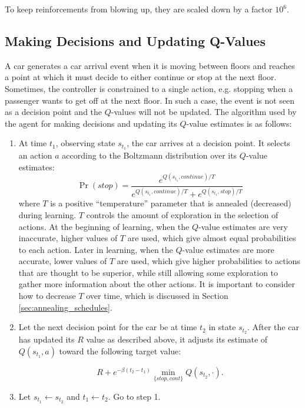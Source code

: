To keep reinforcements from blowing up, they are scaled down by a factor $10^6$.

\label{sec:action_selection}
\subsection{Making Decisions and Updating Q-Values}

A car generates a car arrival event when it is moving between floors and reaches a point at which it must decide to either continue or stop at the next floor. Sometimes, the controller is constrained to a single action, e.g. stopping when a passenger wants to get off at the next floor. In such a case, the event is not seen as a decision point and the $Q$-values will not be updated. The algorithm used by the agent for making decisions and updating its $Q$-value estimates is as follows:
\begin{enumerate}
    \item At time $t_1$, observing state $s_{t_1}$, the car arrives at a decision point. It selects an action $a$ according to the Boltzmann distribution over its $Q$-value estimates:
    \[
        \Pr(stop) = \frac{e^{Q(s_{t_1},continue)/T}}{e^{Q(s_{t_1},continue)/T} + e^{Q(s_{t_1},stop)/T}}
    \]
    where $T$ is a positive ``temperature'' parameter that is annealed (decreased) during learning. $T$ controls the amount of exploration in the selection of actions. At the beginning of learning, when the $Q$-value estimates are very inaccurate, higher values of $T$ are used, which give almost equal probabilities to each action. Later in learning, when the $Q$-value estimates are more accurate, lower values of $T$ are used, which give higher probabilities to actions that are thought to be superior, while still allowing some exploration to gather more information about the other actions. It is important to consider how to decrease $T$ over time, which is discussed in Section \ref{sec:annealing_schedules}.

    \item Let the next decision point for the car be at time $t_2$ in state $s_{t_2}$. After the car has updated its $R$ value as described above, it adjusts its estimate of $Q(s_{t_1}, a)$ toward the following target value:

    \[
    R + e^{-\beta(t_2 - t_1)} \min\limits_{\{stop, cont\}} Q(s_{t_2}, \cdot).    
    \]

    \item
    Let $s_{t_1} \leftarrow s_{t_2}$ and $t_1 \leftarrow t_2$. Go to step 1.

\end{enumerate}
